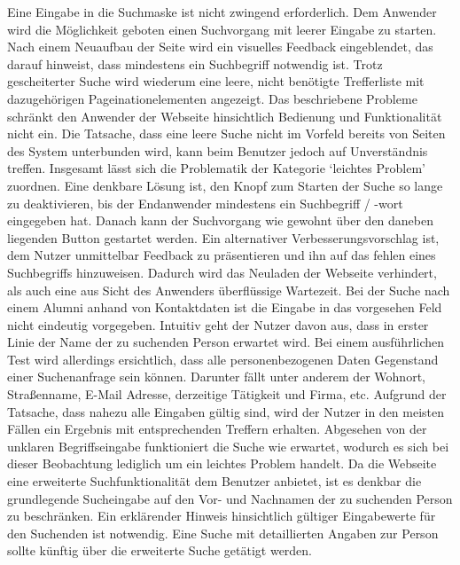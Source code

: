 {
	Eine Eingabe in die Suchmaske ist nicht zwingend erforderlich. Dem Anwender wird die Möglichkeit geboten einen Suchvorgang mit leerer Eingabe zu starten. Nach einem Neuaufbau der Seite wird ein visuelles Feedback eingeblendet, das darauf hinweist, dass mindestens ein Suchbegriff notwendig ist. Trotz gescheiterter Suche wird wiederum eine leere, nicht benötigte Trefferliste mit dazugehörigen Pageinationelementen angezeigt.
}
{
	Das beschriebene Probleme schränkt den Anwender der Webseite hinsichtlich Bedienung und Funktionalität nicht ein. Die Tatsache, dass eine leere Suche nicht im Vorfeld bereits von Seiten des System unterbunden wird, kann beim Benutzer jedoch auf Unverständnis treffen. Insgesamt lässt sich die Problematik der Kategorie ‘leichtes Problem’ zuordnen.
}
{
	Eine denkbare Lösung ist, den Knopf zum Starten der Suche so lange zu deaktivieren, bis der Endanwender mindestens ein Suchbegriff / -wort eingegeben hat. Danach kann der Suchvorgang wie gewohnt über den daneben liegenden Button gestartet werden. Ein alternativer Verbesserungsvorschlag ist, dem Nutzer unmittelbar Feedback zu präsentieren und ihn auf das fehlen eines Suchbegriffs hinzuweisen. Dadurch wird das Neuladen der Webseite verhindert, als auch eine aus Sicht des Anwenders überflüssige Wartezeit.
}
{
	Bei der Suche nach einem Alumni anhand von Kontaktdaten ist die Eingabe in das vorgesehen Feld nicht eindeutig vorgegeben. Intuitiv geht der Nutzer davon aus, dass in erster Linie der Name der zu suchenden Person erwartet wird. Bei einem ausführlichen Test wird allerdings ersichtlich, dass alle personenbezogenen Daten Gegenstand einer Suchenanfrage sein können. Darunter fällt unter anderem der Wohnort, Straßenname, E-Mail Adresse, derzeitige Tätigkeit und Firma, etc.
}
{
	Aufgrund der Tatsache, dass nahezu alle Eingaben gültig sind, wird der Nutzer in den meisten Fällen ein Ergebnis mit entsprechenden Treffern erhalten. Abgesehen von der unklaren Begriffseingabe funktioniert die Suche wie erwartet, wodurch es sich bei dieser Beobachtung lediglich um ein leichtes Problem handelt.
}
{
	Da die Webseite eine erweiterte Suchfunktionalität dem Benutzer anbietet, ist es denkbar die grundlegende Sucheingabe auf den Vor- und Nachnamen der zu suchenden Person zu beschränken. Ein erklärender Hinweis hinsichtlich gültiger Eingabewerte für den Suchenden ist notwendig. Eine Suche mit detaillierten Angaben zur Person sollte künftig über die erweiterte Suche getätigt werden.
}
